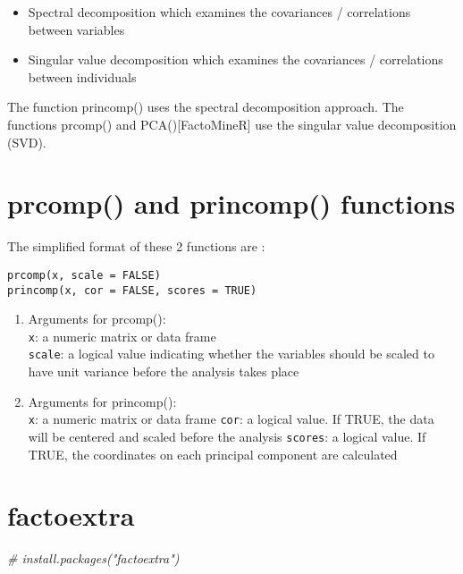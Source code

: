 \documentclass[]{book}
\newenvironment{Shaded}{\begin{snugshade}}{\end{snugshade}}
\newcommand{\CommentTok}[1]{\textcolor[rgb]{0.56,0.35,0.01}{\textit{#1}}}
\providecommand{\tightlist}{%
  \setlength{\itemsep}{0pt}\setlength{\parskip}{0pt}}
\begin{document}
\begin{itemize}
\tightlist
\item
  Spectral decomposition which examines the covariances / correlations between variables
\item
  Singular value decomposition which examines the covariances / correlations between individuals
\end{itemize}

The function princomp() uses the spectral decomposition approach. The functions prcomp() and PCA(){[}FactoMineR{]} use the singular value decomposition (SVD).

\hypertarget{prcomp-and-princomp-functions}{%
\section{prcomp() and princomp() functions}\label{prcomp-and-princomp-functions}}

The simplified format of these 2 functions are :

\begin{verbatim}
prcomp(x, scale = FALSE)
princomp(x, cor = FALSE, scores = TRUE)
\end{verbatim}

\begin{enumerate}
\def\labelenumi{\arabic{enumi}.}
\item
  Arguments for prcomp():\\
  \texttt{x}: a numeric matrix or data frame\\
  \texttt{scale}: a logical value indicating whether the variables should be scaled to have unit variance before the analysis takes place
\item
  Arguments for princomp():\\
  \texttt{x}: a numeric matrix or data frame
  \texttt{cor}: a logical value. If TRUE, the data will be centered and scaled before the analysis
  \texttt{scores}: a logical value. If TRUE, the coordinates on each principal component are calculated
\end{enumerate}

\hypertarget{factoextra}{%
\section{factoextra}\label{factoextra}}

\begin{Shaded}
\begin{Highlighting}[]
\CommentTok{# install.packages("factoextra")}
\end{Highlighting}
\end{Shaded}
\end{document}
